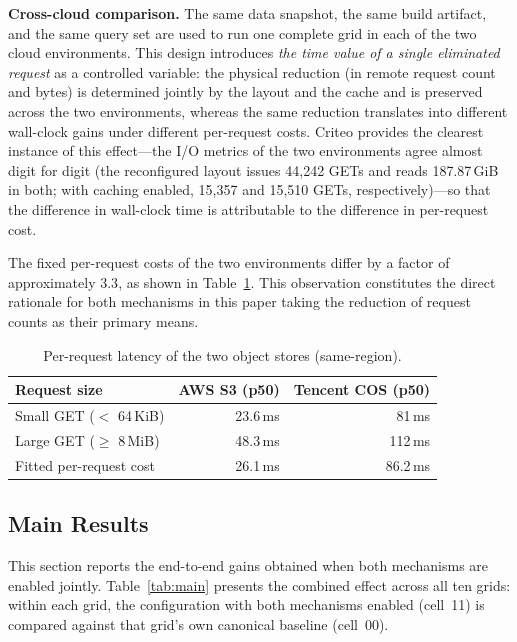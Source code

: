 \textbf{Cross-cloud comparison.}
The same data snapshot, the same build artifact, and the same query set are
used to run one complete grid in each of the two cloud environments. This
design introduces \emph{the time value of a single eliminated request} as a
controlled variable: the physical reduction (in remote request count and bytes)
is determined jointly by the layout and the cache and is preserved across the
two environments, whereas the same reduction translates into different
wall-clock gains under different per-request costs. Criteo provides the
clearest instance of this effect---the I/O metrics of the two environments
agree almost digit for digit (the reconfigured layout issues 44{,}242 GETs and
reads 187.87\,GiB in both; with caching enabled, 15{,}357 and 15{,}510 GETs,
respectively)---so that the difference in wall-clock time is attributable to
the difference in per-request cost.

The fixed per-request costs of the two environments differ by a factor of
approximately $3.3$, as shown in Table~\ref{tab:latency}. This observation
constitutes the direct rationale for both mechanisms in this paper taking the
reduction of request counts as their primary means.

\begin{table}[t]
\centering
\footnotesize
\caption{Per-request latency of the two object stores (same-region).}
\label{tab:latency}
\begin{tabular}{@{}lrr@{}}
\toprule
Request size & AWS S3 (p50) & Tencent COS (p50) \\
\midrule
Small GET ($<$ 64\,KiB) & 23.6\,ms & 81\,ms \\
Large GET ($\geq$ 8\,MiB) & 48.3\,ms & 112\,ms \\
Fitted per-request cost & 26.1\,ms & 86.2\,ms \\
\bottomrule
\end{tabular}
\end{table}

\subsection{Main Results}
\label{subsec:main}

This section reports the end-to-end gains obtained when both mechanisms are
enabled jointly. Table~\ref{tab:main} presents the combined effect across all
ten grids: within each grid, the configuration with both mechanisms enabled
(cell~11) is compared against that grid's own canonical baseline (cell~00).

